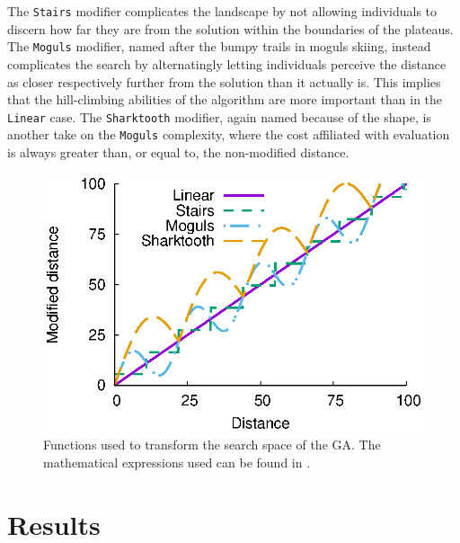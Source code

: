 \documentclass[a4paper,12pt]{article}
\theoremstyle{plain}
\theoremstyle{definition}
\begin{document}
         The \texttt{Stairs} modifier complicates the landscape by not allowing
         individuals to discern how far they are from the solution within the
         boundaries of the plateaus. The \texttt{Moguls} modifier, named after the bumpy
         trails in moguls skiing, instead complicates the search by alternatingly letting 
         individuals perceive the distance as closer respectively further from the 
         solution than it actually is. This implies that the hill-climbing abilities of 
         the algorithm are more important than in the \texttt{Linear} case. The
         \texttt{Sharktooth} modifier, again named because of the shape, is
         another take on the \texttt{Moguls} complexity, where the cost
         affiliated with evaluation is always greater than, or equal to, the
         non-modified distance.


      \begin{figure}[H]
         \centering
         \includegraphics[scale=.9]{complexities} %
         \caption{Functions used to transform the search space of the GA. The
         mathematical expressions used can be found in
         .}
         \label{fig:complexities}
      \end{figure}




\section{Results}
\end{document}

